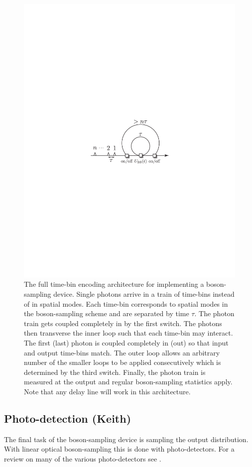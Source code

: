 \documentclass[aps,pra,twocolumn,amsmath,amssymb,nofootinbib,superscriptaddress]{revtex4}
\begin{document}
\begin{figure}[!htb]
\includegraphics[width=0.7\columnwidth]{fiber_loop}
\caption{The full time-bin encoding architecture for implementing a boson-sampling device. Single photons arrive in a train of time-bins instead of in spatial modes. Each time-bin corresponds to spatial modes in the boson-sampling scheme and are separated by time $\tau$. The photon train gets coupled completely in by the first switch. The photons then transverse the inner loop such that each time-bin may interact. The first (last) photon is coupled completely in (out) so that input and output time-bins match. The outer loop allows an arbitrary number of the smaller loops to be applied consecutively which is determined by the third switch. Finally, the photon train is measured at the output and regular boson-sampling statistics apply. Note that any delay line will work in this architecture.}
\label{fig:fiber_loop}
\end{figure}

\subsection{Photo-detection (Keith)}
The final task of the boson-sampling device is sampling the output distribution. With linear optical boson-sampling this is done with photo-detectors. For a review on many of the various photo-detectors see \cite{bib:SourceAndDetectorReview}.  
\end{document}
